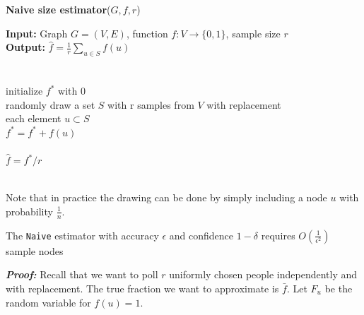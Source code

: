 \begin{algorithm*}[!htb]
  \caption{\small {\bf Naive size estimator}($G, f, r$)}
  \begin{code}
  {\bf Input:} Graph $G=(V,E)$, function $f : V \rightarrow \{0,1\}$, sample size $r$ \\
  {\bf Output:} $\hat{f}=\frac{1}{r}\sum\nolimits_{u\in S} f(u)$\\
  \\
  \uln \>\ubegin\\
  \uln \>\>initialize $f^*$ with 0 \\
  \uln \>\>randomly draw a set $S$ with r samples from $V$ with replacement\\
  \uln \>\>\ufor each element $u \subset S$ \udo\\
  \uln \>\>\>$f^* = f^* + f(u)$ \\
  \uln \>\>\uend\\
  \uln \>\ureturn $\hat{f} = f^*/r$ \\
  \uln \>\uend\\ 
  \end{code}
  \label{algnaive}
\end{algorithm*}
Note that in practice the drawing can be done by simply including a node $u$ with probability $\frac{1}{n}$.
\begin{theorem}
  The \texttt{Naive} estimator with accuracy $\epsilon$ and confidence $1-\delta$ requires $O(\frac{1}{\epsilon^2})$ sample nodes
\end{theorem}
\textbf{\textit{Proof: }}Recall that we want to poll $r$ uniformly chosen people independently and with replacement. The true fraction we want to approximate is $\bar{f}$. Let $F_u$ be the random variable for $f(u) = 1$.

